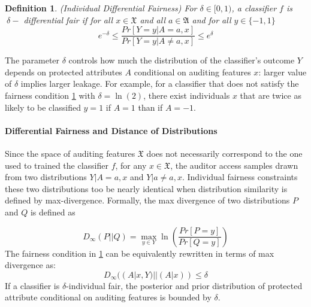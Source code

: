 \documentclass{article}
\newtheorem{defn}{Definition}[section]
\begin{document}
\begin{defn}(Individual Differential Fairness)
\label{def: idf}
For $\delta \in [0, 1)$, a classifier $f$ is $\ \delta-$ differential fair if for all $x\in\mathfrak{X}$ and all $a\in \mathfrak{A}$ and for all $y\in\{-1, 1\}$
\begin{equation}
\label{eq: idf}
   e^{-\delta} \leq \frac{Pr[Y=y|A =a, x]}{Pr[Y=y|A\neq a, x]} \leq e^{\delta}
\end{equation}
\end{defn}

The parameter $\delta$ controls how much the distribution of the classifier's outcome $Y$ depends on protected attributes $A$ conditional on auditing features $x$: larger value of $\delta$ implies larger leakage. For example, for a classifier that does not satisfy the fairness condition \ref{def: idf} with $\delta=\ln(2)$, there exist individuals $x$ that are twice as likely to be classified $y=1$ if $A=1$ than if $A=-1$. 

\paragraph{Differential Fairness and Distance of Distributions}
Since the space of auditing features $\mathfrak{X}$ does not necessarily correspond to the one used to trained the classifier $f$, for any $x\in \mathfrak{X}$, the auditor access samples drawn from two distributions $Y|A=a, x$ and $Y|a\neq a, x$. Individual fairness constraints these two distributions too be nearly identical when distribution similarity is defined by max-divergence. Formally, the max divergence of two distributions $P$ and $Q$ is defined as 

\begin{equation}
D_{\infty}(P||Q) = \max_{y\in Y}\ln\left(\frac{Pr[P=y]}{Pr[Q=y]}\right)
\end{equation}
The fairness condition in \ref{def: idf} can be equivalently rewritten in terms of max divergence as:
\begin{equation}
\label{eq: maxdiv_idf}
D_{\infty}((A|x, Y)||(A| x)) \leq \delta
\end{equation}
If a classifier is $\delta$-individual fair, the posterior and prior distribution of protected attribute conditional on auditing features is bounded by $\delta$. 
\end{document}
